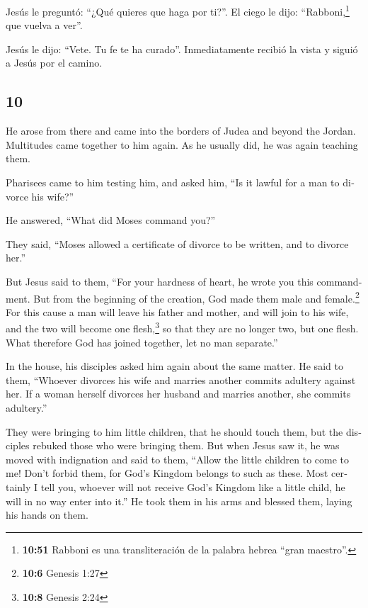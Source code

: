 \begin{paracol}{2}
 Jesús le preguntó: ``¿Qué quieres que haga por ti?''. El
ciego le dijo: ``Rabboni,\footnote{\textbf{10:51} Rabboni es una
  transliteración de la palabra hebrea ``gran maestro''.} que vuelva a
ver''.

 Jesús le dijo: ``Vete. Tu fe te ha curado''.
Inmediatamente recibió la vista y siguió a Jesús por el camino.

\switchcolumn
\begin{otherlanguage}{english}

\hypertarget{section-19}{%
\section{10}\label{section-19}}

 He arose from there and came into the borders of Judea
and beyond the Jordan. Multitudes came together to him again. As he
usually did, he was again teaching them.

 Pharisees came to him testing him, and asked him, ``Is it
lawful for a man to divorce his wife?''

 He answered, ``What did Moses command you?''

 They said, ``Moses allowed a certificate of divorce to be
written, and to divorce her.''

 But Jesus said to them, ``For your hardness of heart, he
wrote you this commandment.  But from the beginning of the
creation, God made them male and female.\footnote{\textbf{10:6} Genesis
  1:27}  For this cause a man will leave his father and
mother, and will join to his wife,  and the two will
become one flesh,\footnote{\textbf{10:8} Genesis 2:24} so that they are
no longer two, but one flesh.  What therefore God has
joined together, let no man separate.''

 In the house, his disciples asked him again about the
same matter.  He said to them, ``Whoever divorces his
wife and marries another commits adultery against her. 
If a woman herself divorces her husband and marries another, she commits
adultery.''

 They were bringing to him little children, that he
should touch them, but the disciples rebuked those who were bringing
them.  But when Jesus saw it, he was moved with
indignation and said to them, ``Allow the little children to come to me!
Don't forbid them, for God's Kingdom belongs to such as these.
 Most certainly I tell you, whoever will not receive
God's Kingdom like a little child, he will in no way enter into it.''
 He took them in his arms and blessed them, laying his
hands on them.


\end{otherlanguage}
\end{paracol}
